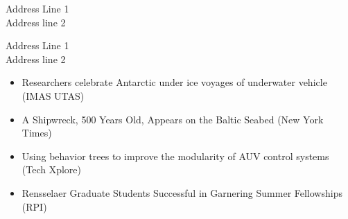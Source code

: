\documentclass[10pt,a4paper,ragged2e,withhyper]{altacv}
\begin{document}
\begin{paracol}{2}
\divider




\newpage
{}



{Address Line 1\\Address line 2}

\divider

{Address Line 1\\Address line 2}

\begin{itemize}
  \item Researchers celebrate Antarctic under ice voyages of underwater vehicle (IMAS UTAS)
  \item A Shipwreck, 500 Years Old, Appears on the Baltic Seabed (New York Times)
  \item Using behavior trees to improve the modularity of AUV control systems (Tech Xplore)
  \item Rensselaer Graduate Students Successful in Garnering Summer Fellowships (RPI)
\end{itemize}

\end{paracol}
\end{document}
